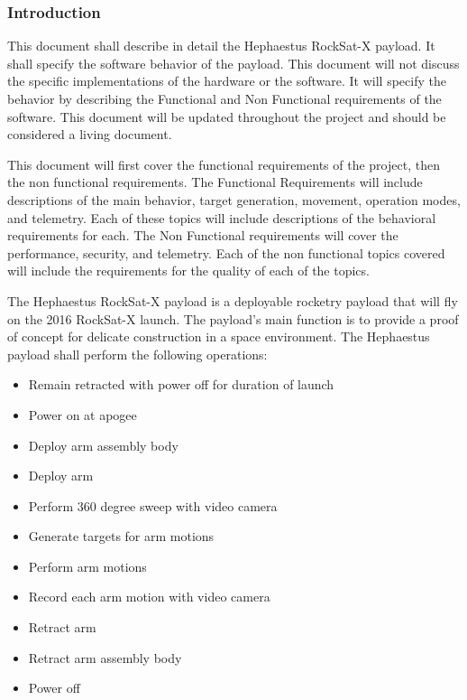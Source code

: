 \subsubsection{Introduction}
This document shall describe in detail the Hephaestus RockSat-X payload.
It shall specify the software behavior of the payload.
This document will not discuss the specific implementations of the hardware or the software.
It will specify the behavior by describing the Functional and Non Functional requirements of the software.
This document will be updated throughout the project and should be considered a living document.

This document will first cover the functional requirements of the project, then the non functional requirements.
The Functional Requirements will include descriptions of the main behavior, target generation, movement, operation modes, and telemetry.
Each of these topics will include descriptions of the behavioral requirements for each.
The Non Functional requirements will cover the performance, security, and telemetry.
Each of the non functional topics covered will include the requirements for the quality of each of the topics.

The Hephaestus RockSat-X payload is a deployable rocketry payload that will fly on the 2016 RockSat-X launch.
The payload's main function is to provide a proof of concept for delicate construction in a space environment.
The Hephaestus payload shall perform the following operations:
\begin{itemize}
\item{Remain retracted with power off for duration of launch}
\item{Power on at apogee}
\item{Deploy arm assembly body}
\item{Deploy arm}
\item{Perform 360 degree sweep with video camera}
\item{Generate targets for arm motions}
\item{Perform arm motions}
\item{Record each arm motion with video camera}
\item{Retract arm}
\item{Retract arm assembly body}
\item{Power off}
\end{itemize}

